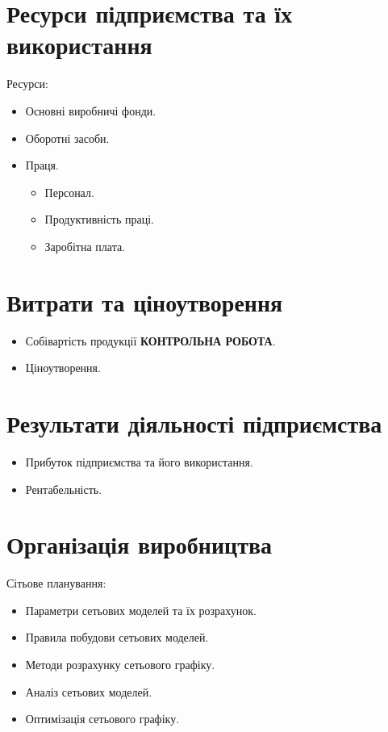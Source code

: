 \documentclass[a4paper,10pt,notitlepage,pdftex,headsepline]{scrartcl}
\begin{document}
\section{Ресурси підприємства та їх використання}
  Ресурси:
    \begin{itemize}
      \item Основні виробничі фонди.
      \item Оборотні засоби.
      \item Праця.
        \begin{itemize}
          \item Персонал.
          \item Продуктивність праці.
          \item Заробітна плата.
        \end{itemize}
    \end{itemize}
\section{Витрати та ціноутворення}
  \begin{itemize}
    \item Собівартість продукції \textbf{КОНТРОЛЬНА РОБОТА}.
    \item Ціноутворення.
  \end{itemize}
\section{Результати діяльності підприємства}
  \begin{itemize}
    \item Прибуток підприємства та його використання.
    \item Рентабельність.
  \end{itemize}
\section{Організація виробництва}
  Сітьове планування:
    \begin{itemize}
      \item Параметри сетьових моделей та їх розрахунок.
      \item Правила побудови сетьових моделей.
      \item Методи розрахунку сетьового графіку.
      \item Аналіз сетьових моделей.
      \item Оптимізація сетьового графіку.
    \end{itemize}
\end{document}
